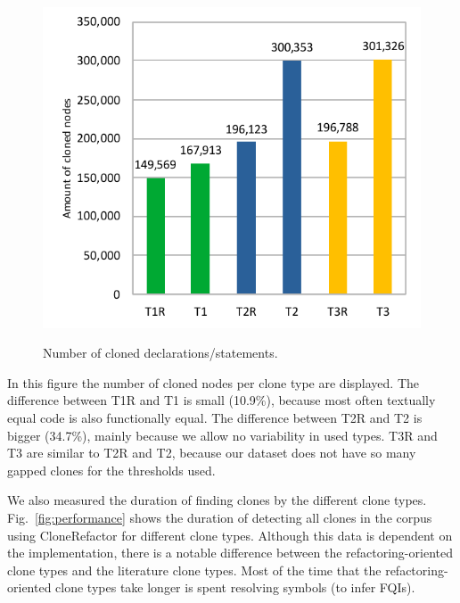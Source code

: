 \documentclass[a4paper]{article}
\begin{document}
\begin{figure}[H]
  \caption{Number of cloned declarations/statements.}
    \includegraphics[width=.9\columnwidth]{img/TypeResults}
  \label{fig:typeres}
\end{figure}

In this figure the number of cloned nodes per clone type are displayed. The difference between T1R and T1 is small (10.9\%), because most often textually equal code is also functionally equal. The difference between T2R and T2 is bigger (34.7\%), mainly because we allow no variability in used types. T3R and T3 are similar to T2R and T2, because our dataset does not have so many gapped clones for the thresholds used.

We also measured the duration of finding clones by the different clone types. Fig.~\ref{fig:performance} shows the duration of detecting all clones in the corpus using CloneRefactor for different clone types. Although this data is dependent on the implementation, there is a notable difference between the refactoring-oriented clone types and the literature clone types. Most of the time that the refactoring-oriented clone types take longer is spent resolving symbols (to infer FQIs).
\end{document}
